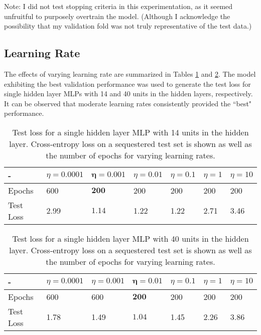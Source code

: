 \documentclass{article}[12 pt]
\begin{document}
\noindent
Note: I did not test stopping criteria in this experimentation, as it seemed unfruitful to purposely overtrain the model.  (Although I acknowledge the possibility that my validation fold was not truly representative of the test data.)


\subsection*{Learning Rate}
	
The effects of varying learning rate are summarized in Tables \ref{tab:Q2_learning_rate_variation_14} and \ref{tab:Q2_learning_rate_variation_40}.  The model exhibiting the best validation performance was used to generate the  test loss for single hidden layer MLPs with 14 and 40 units in the hidden layers, respectively.  It can be observed that moderate learning rates consistently provided the ``best" performance.

\begin{table}[H]
	\caption{Test loss for a single hidden layer MLP with 14 units in the hidden layer.  Cross-entropy loss on a sequestered test set is shown as well as the number of epochs for varying learning rates.}
	\label{tab:Q2_learning_rate_variation_14}
	\begin{center}
		\begin{tabularx}{\textwidth}{ |X|X|X|X|X|X|X| } 
			\hline
			- & $\eta=0.0001$ & $\bm{\eta=0.001}$ & $\eta=0.01$ & $\eta=0.1$ & $\eta=1$ & $\eta=10$\\
			\hline
			Epochs & 600 &  $\bm{200}$ & 200 & 200 & 200 & 200\\
			\hline
			Test Loss & 2.99 & $\bm{1.14}$ & 1.22 & 1.22 & 2.71 & 3.46\\
			\hline
		\end{tabularx}
	\end{center}
\end{table}

\begin{table}[H]
	\caption{Test loss for a single hidden layer MLP with 40 units in the hidden layer.  Cross-entropy loss on a sequestered test set is shown as well as the number of epochs for varying learning rates.}
	\label{tab:Q2_learning_rate_variation_40}
	\begin{center}
		\begin{tabularx}{\textwidth}{ |X|X|X|X|X|X|X| } 
			\hline
			- & $\eta=0.0001$ & $\eta=0.001$ & $\bm{\eta=0.01}$ & $\eta=0.1$ & $\eta=1$ & $\eta=10$\\
			\hline
			Epochs & 600 &  600 & $\bm{200}$ & 200 & 200 & 200\\
			\hline
			Test Loss & 1.78 & 1.49 & $\bm{1.04}$ & 1.45 & 2.26 & 3.86\\
			\hline
		\end{tabularx}
	\end{center}
\end{table}
\end{document}

